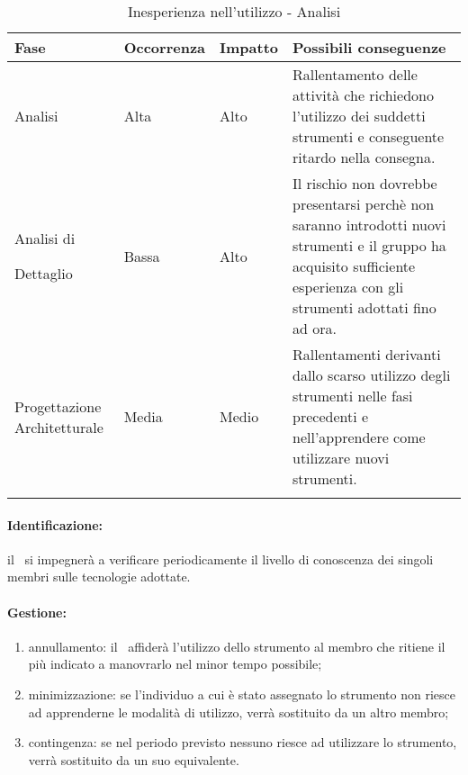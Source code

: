 \documentclass[../PianoProgetto.tex]{subfiles}
\begin{document}

	\begin{table} [h]
		\centering
		\begin{tabularx}{\textwidth}{F O O P}
			\toprule
			\textbf{Fase} & \textbf{Occorrenza} & \textbf{Impatto} & \textbf{Possibili conseguenze}\\
			\midrule
			Analisi & Alta & Alto & Rallentamento delle attività che richiedono l'utilizzo dei suddetti strumenti e conseguente ritardo nella consegna. \\
			\midrule
			Analisi di \par Dettaglio & Bassa & Alto & Il rischio non dovrebbe presentarsi perchè non saranno introdotti nuovi strumenti e il gruppo ha acquisito sufficiente esperienza con gli strumenti adottati fino ad ora. \\
			\midrule
			Progettazione Architetturale & Media &  Medio & Rallentamenti derivanti dallo scarso utilizzo degli strumenti nelle fasi precedenti e nell'apprendere come utilizzare nuovi strumenti. \\
			\bottomrule
		\end{tabularx}
		\caption{Inesperienza nell'utilizzo - Analisi}
		\label{tab:Inesperienza nell'utilizzo - Analisi}	
	\end{table}	
	
	\paragraph*{Identificazione:} il \responsabilediprogetto\ si impegnerà a verificare periodicamente il livello di conoscenza dei singoli membri sulle tecnologie adottate.
	
	\paragraph*{Gestione:}
	\begin{enumerate}
		\item annullamento: il \responsabilediprogetto\ affiderà l'utilizzo dello strumento al membro che ritiene il più indicato a manovrarlo nel minor tempo possibile;
		\item minimizzazione: se l'individuo a cui è stato assegnato lo strumento non riesce ad apprenderne le modalità di utilizzo, verrà sostituito da un altro membro;
		\item contingenza: se nel periodo previsto nessuno riesce ad utilizzare lo strumento, verrà sostituito da un suo equivalente. 
	\end{enumerate}		
	
\end{document}
